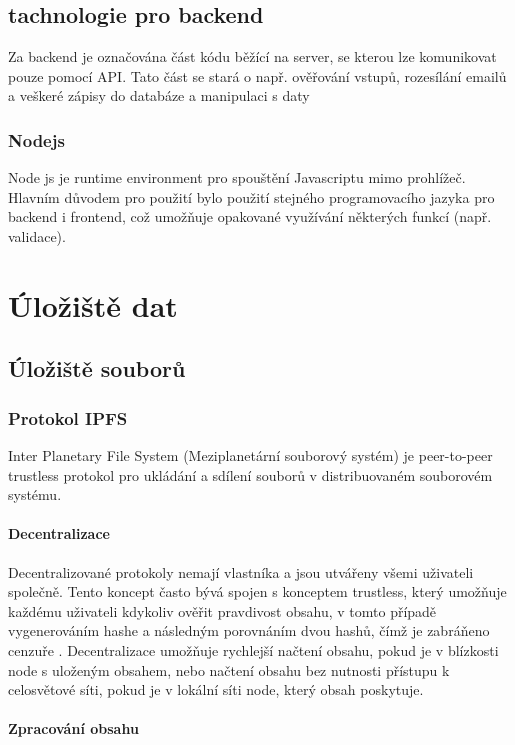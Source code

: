 \documentclass[12pt, a4paper,
 twoside,        %
 openright
]{report}
\begin{document}
\section{tachnologie pro backend}
Za backend je označována část kódu běžící na server, se kterou lze komunikovat pouze pomocí API. Tato část se stará o např. ověřování vstupů, rozesílání emailů a veškeré zápisy do databáze a manipulaci s daty
\cite{whatIsFrontend}
\subsection{Nodejs}
Node js je runtime environment pro spouštění Javascriptu mimo prohlížeč. Hlavním důvodem pro použití bylo použití stejného programovacího jazyka pro backend i frontend, což umožňuje opakované využívání některých funkcí (např. validace). \cite{aboutNodeJS}
 
\chapter{Úložiště dat}
    \section{Úložiště souborů}
        \subsection{Protokol IPFS}\label{subsection:IPFS}
        Inter Planetary File System (Meziplanetární souborový systém) je peer-to-peer trustless protokol pro ukládání a sdílení souborů v distribuovaném souborovém systému. \cite{IPFSDocs}
        \subsubsection{Decentralizace}
            Decentralizované protokoly nemají vlastníka a jsou utvářeny všemi uživateli společně. Tento koncept často bývá spojen s konceptem trustless, který umožňuje každému uživateli kdykoliv ověřit pravdivost obsahu, v tomto případě vygenerováním hashe a následným porovnáním dvou hashů, čímž je zabráňeno cenzuře \cite{decentralizedVsTrustless}. Decentralizace umožňuje rychlejší načtení obsahu, pokud je v blízkosti node s uloženým obsahem, nebo načtení obsahu bez nutnosti přístupu k celosvětové síti, pokud je v lokální síti node, který obsah poskytuje. \cite{decentralizedAndDistributedNetworks}\cite{decentralizedAndTrustless}
        \subsubsection{Zpracování obsahu}
\end{document}
